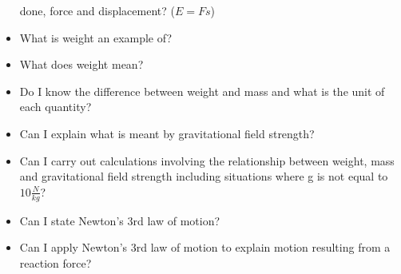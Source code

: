 \begin{multicols}{2}
\begin{itemize}
			done, force and displacement? ($E = F s$)
		\item What is weight an example of?
		\item What does weight mean?
		\item Do I know the difference between weight and mass and what is the unit
			of each quantity?
		\item Can I explain what is meant by gravitational field strength?
		\item Can I carry out calculations involving the relationship between weight,
			mass and gravitational field strength including situations where g is not
			equal to $10 \frac{N}{kg}$?
		\item Can I state Newton's 3rd law of motion?
		\item Can I apply Newton's 3rd law of motion to explain motion resulting from
			a reaction force?
	\end{itemize}
\end{multicols}

